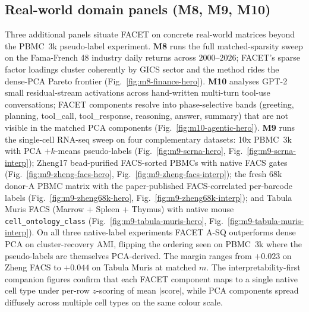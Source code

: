 \subsection{Real-world domain panels (M8, M9, M10)}
Three additional panels situate FACET on concrete real-world matrices beyond the PBMC~3k pseudo-label experiment. \textbf{M8} runs the full matched-sparsity sweep on the Fama-French 48 industry daily returns across $2000$--$2026$; FACET's sparse factor loadings cluster coherently by GICS sector and the method rides the dense-PCA Pareto frontier (Fig.~\ref{fig:m8-finance-hero}). \textbf{M10} analyses GPT-2 small residual-stream activations across hand-written multi-turn tool-use conversations; FACET components resolve into phase-selective bands (greeting, planning, tool\_call, tool\_response, reasoning, answer, summary) that are not visible in the matched PCA components (Fig.~\ref{fig:m10-agentic-hero}). \textbf{M9} runs the single-cell RNA-seq sweep on four complementary datasets: 10x PBMC~3k with PCA $+ k$-means pseudo-labels (Fig.~\ref{fig:m9-scrna-hero}, Fig.~\ref{fig:m9-scrna-interp}); Zheng17 bead-purified FACS-sorted PBMCs with native FACS gates (Fig.~\ref{fig:m9-zheng-facs-hero}, Fig.~\ref{fig:m9-zheng-facs-interp}); the fresh 68k donor-A PBMC matrix with the paper-published FACS-correlated per-barcode labels (Fig.~\ref{fig:m9-zheng68k-hero}, Fig.~\ref{fig:m9-zheng68k-interp}); and Tabula Muris FACS (Marrow + Spleen + Thymus) with native mouse \texttt{cell\_ontology\_class} (Fig.~\ref{fig:m9-tabula-muris-hero}, Fig.~\ref{fig:m9-tabula-muris-interp}). On all three native-label experiments FACET A-SQ outperforms dense PCA on cluster-recovery AMI, flipping the ordering seen on PBMC~3k where the pseudo-labels are themselves PCA-derived. The margin ranges from $+0.023$ on Zheng FACS to $+0.044$ on Tabula Muris at matched $m$. The interpretability-first companion figures confirm that each FACET component maps to a single native cell type under per-row $z$-scoring of mean $|$score$|$, while PCA components spread diffusely across multiple cell types on the same colour scale.












